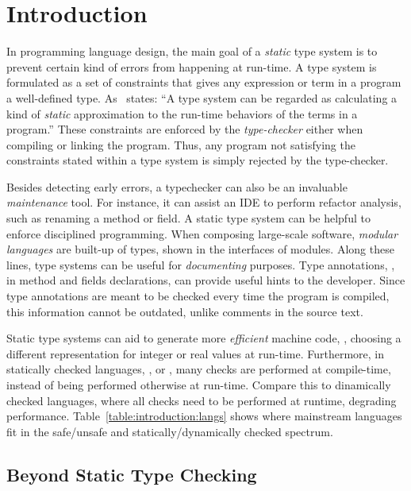 \chapter{Introduction}

In programming language design, the main goal of a \emph{static} type system is to prevent certain kind of errors from happening at run-time.
A type system is formulated as a set of constraints that gives any expression or term in a program a well-defined type.
As~\cite{pierceTypesProgrammingLanguages2002} states:
``A type system can be regarded as calculating a kind of \emph{static} approximation to the run-time behaviors of the terms in a program.''
These constraints are enforced by the \emph{type-checker} either when compiling or linking the program.
Thus, any program not satisfying the constraints stated within a type system is simply rejected by the type-checker.

Besides detecting early errors,
a typechecker can also be an invaluable \emph{maintenance} tool.
For instance, it can assist an IDE to perform refactor analysis,
such as renaming a method or field.
A static type system can be helpful to enforce disciplined programming.
When composing large-scale software,
\emph{modular languages} are built-up of types,
shown in the interfaces of modules.
Along these lines,
type systems can be useful for \emph{documenting} purposes.
Type annotations, \eg{}, in method and fields declarations,
can provide useful hints to the developer.
Since type annotations are meant to be checked every time the program is compiled,
this information cannot be outdated, unlike comments in the source text.

Static type systems can aid to generate more \emph{efficient} machine code, \eg{},
choosing a different representation for integer or real values at run-time.
Furthermore, in statically checked languages, \eg{}, \java{} or \rust{},
many checks are performed at compile-time,
instead of being performed otherwise at run-time.
Compare this to dinamically checked languages,
where all checks need to be performed at runtime,
degrading performance.
Table~\ref{table:introduction:langs} shows where mainstream languages fit in the safe/unsafe and statically/dynamically checked spectrum.



\section{Beyond Static Type Checking}

